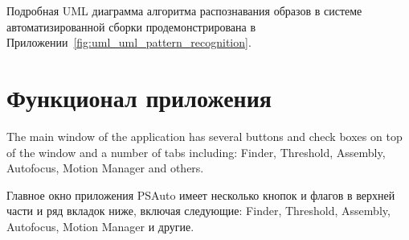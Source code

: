 Подробная UML диаграмма алгоритма распознавания образов в системе автоматизированной сборки продемонстрирована в Приложении~\ref{fig:uml_uml_pattern_recognition}.

\section{Функционал приложения}

The main window of the application has several buttons and check boxes on top of the window and a number of tabs including: Finder, Threshold, Assembly, Autofocus, Motion Manager and others.

Главное окно приложения PSAuto имеет несколько кнопок и флагов в верхней части и ряд вкладок ниже, включая следующие: Finder, Threshold, Assembly, Autofocus, Motion Manager и другие.

